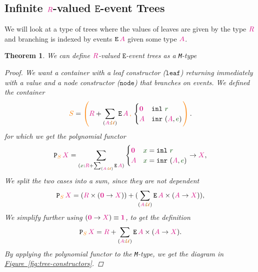 \documentclass[twoside,11pt,openright]{report}
\theoremstyle{plain} %
\newtheorem{thm}{Theorem}[section]
\theoremstyle{definition}
\theoremstyle{remark}
\newcommand*{\figref}[1]{\hyperref[fig:#1]{Figure~\ref*{fig:#1}}}
\newcommand*{\term}[1]{\textcolor{green!30!black}{#1}} %
\newcommand*{\type}[1]{\textcolor{magenta!90!black}{#1}}
\newcommand*{\container}[1]{\textcolor{orange}{#1}}
\newcommand*{\containerpair}[2]{\ensuremath{\colorlet{savedleftcolor}{.}\color{orange}\left(\color{savedleftcolor}#1\,\textcolor{orange}{\mathbf{,}}\,#2\color{orange}\right)\color{savedleftcolor}}}
\newcommand*{\universe}[1]{\textcolor{orange!80!black}{#1}}
\newcommand*{\unit}{\type{\textbf{1}}}
\newcommand*{\empt}{\type{\textbf{0}}}
\newcommand*{\constructor}[1]{\textcolor{purple!60!black}{\ensuremath{\mathtt{#1}}}}
\newcommand*{\typeformer}[1]{\ensuremath{\mathtt{#1}}}
\newcommand*{\functor}[1]{\ensuremath{\mathbf{\mathtt{#1}}}}
\begin{document}
\subsection{Infinite \(\type{R}\)-valued \(\typeformer{E}\)-event Trees}
We will look at a type of trees where the values of leaves are given by the type \(\type{R}\) and branching is indexed by events \(\typeformer{E}\,\type{A}\) given some type \(\type{A}\).
\begin{thm}
  We can define \(\type{R}\)-valued \(\typeformer{E}\)-event trees as a \texttt{M}-type
  \begin{proof}
    We want a container with a leaf constructor (\constructor{leaf}) returning immediately with a value and a node constructor (\constructor{node}) that branches on events. We defined the container
  \begin{equation}
    \container{S} = \containerpair{\type{R} + \sum_{(\type{A} : \universe{\mathcal{U}})} \typeformer{E}\,\type{A}}{\begin{cases}\empt & \mathtt{inl}~\term{r} \\ \type{A} & \mathtt{inr}~(\type{A},\term{e})\end{cases}}.
  \end{equation}
for which we get the polynomial functor
\begin{equation}
  \functor{P}_{\container{S}}\,\type{X} = \sum_{(\term{x} : \type{R} + \sum_{(\type{A} : \universe{\mathcal{U}})} \typeformer{E}\,\type{A})} \begin{cases}\empt & \term{x} = \mathtt{inl}~\term{r} \\ \type{A} & \term{x} = \mathtt{inr}~(\type{A},\term{e})\end{cases} \rightarrow \type{X},
\end{equation}
We split the two cases into a sum, since they are not dependent
\begin{equation}
  \functor{P}_{\container{S}}\,\type{X} = (\type{R} \times (\empt \rightarrow \type{X})) + (\sum_{(\type{A} : \universe{\mathcal{U}})} \typeformer{E}\,\type{A} \times (\type{A} \rightarrow \type{X})),
\end{equation}
We simplify further using \((\empt \rightarrow \type{X}) \equiv \unit\), to get the definition
\begin{equation}
  \functor{P}_{\container{S}}\,\type{X} = \type{R} + \sum_{(\type{A} : \universe{\mathcal{U}})} \typeformer{E}\,\type{A} \times (\type{A} \rightarrow \type{X}).
\end{equation}
By applying the polynomial functor to the \texttt{M}-type, we get the diagram in \figref{tree-constructors}. 

\end{proof}
\end{thm}
\end{document}
